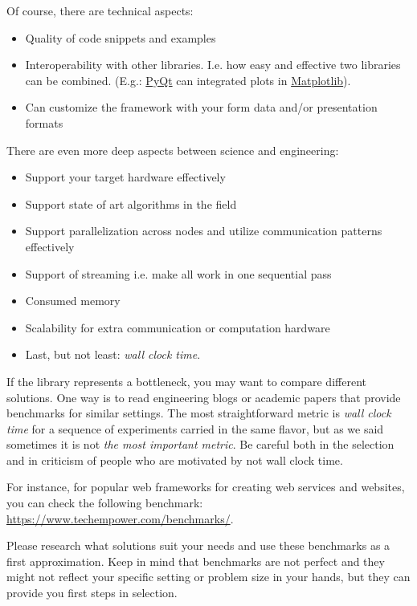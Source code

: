 \documentclass[
]{article}
\begin{document}
Of course, there are technical aspects:

\begin{itemize}
\item
  Quality of code snippets and examples
\item
  Interoperability with other libraries. I.e. how easy and effective two
  libraries can be combined. (E.g.:
  \href{https://en.wikipedia.org/wiki/PyQt}{PyQt} can integrated plots
  in \href{https://en.wikipedia.org/wiki/Matplotlib}{Matplotlib}).
\item
  Can customize the framework with your form data and/or presentation
  formats
\end{itemize}

There are even more deep aspects between science and engineering:

\begin{itemize}
\item
  Support your target hardware effectively
\item
  Support state of art algorithms in the field
\item
  Support parallelization across nodes and utilize communication
  patterns effectively
\item
  Support of streaming i.e. make all work in one sequential pass
\item
  Consumed memory
\item
  Scalability for extra communication or computation hardware
\item
  Last, but not least: \emph{wall clock time}.
\end{itemize}

If the library represents a bottleneck, you may want to compare
different solutions. One way is to read engineering blogs or academic
papers that provide benchmarks for similar settings. The most
straightforward metric is \emph{wall clock time} for a sequence of
experiments carried in the same flavor, but as we said sometimes it is
not \emph{the most important metric}. Be careful both in the selection
and in criticism of people who are motivated by not wall clock time.

For instance, for popular web frameworks for creating web services and
websites, you can check the following benchmark:\\
\url{https://www.techempower.com/benchmarks/}.

Please research what solutions suit your needs and use these benchmarks
as a first approximation. Keep in mind that benchmarks are not perfect
and they might not reflect your specific setting or problem size in your
hands, but they can provide you first steps in selection.
\end{document}
